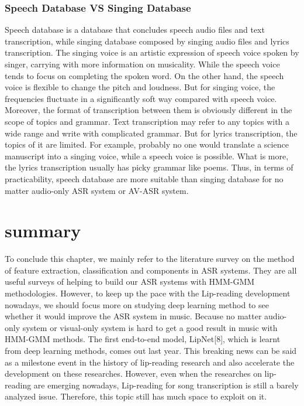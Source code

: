 \subsubsection{Speech Database VS Singing Database}
Speech database is a database that concludes speech audio files and text transcription, while singing database composed by singing audio files and lyrics transcription. The singing voice is an artistic expression of speech voice spoken by singer, carrying with more information on musicality. While the speech voice tends to focus on completing the spoken word. On the other hand, the speech voice is flexible to change the pitch and loudness. But for singing voice, the frequencies fluctuate in a significantly soft way compared with speech voice. Moreover, the format of transcription between them is obviously different in the scope of topics and grammar. Text transcription may refer to any topics with a wide range and write with complicated grammar. But for lyrics transcription, the topics of it are limited. For example, probably no one would translate a science manuscript into a singing voice, while a speech voice is possible. What is more, the lyrics transcription usually has picky grammar like poems.
Thus, in terms of practicability, speech database are more suitable than singing database for no matter audio-only ASR system or AV-ASR system.

\section{summary}
To conclude this chapter, we mainly refer to the literature survey on the method of feature extraction, classification and components in ASR systems. They are all useful surveys of helping to build our ASR systems with HMM-GMM methodologies. However, to keep up the pace with the Lip-reading development nowadays, we should focus more on studying deep learning method to see whether it would improve the ASR system in music. Because no matter audio-only system or visual-only system is hard to get a good result in music with HMM-GMM methods.
The first end-to-end model, LipNet[8], which is learnt from deep learning methods, comes out last year. This breaking news can be said as a milestone event in the history of lip-reading research and also accelerate the development on these researches. However, even when the researches on lip-reading are emerging nowadays, Lip-reading for song transcription is still a barely analyzed issue. Therefore, this topic still has much space to exploit on it.
